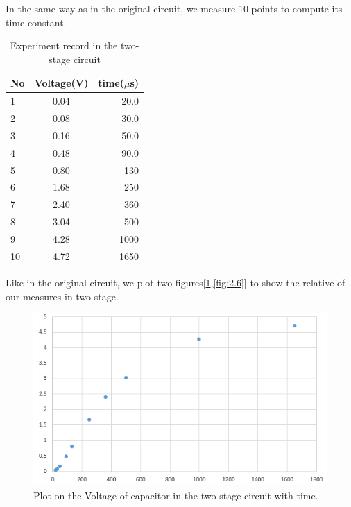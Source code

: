 \phantom{ } In the same way as in the original circuit, we measure 10 points to compute its time constant.
\begin{table}[!htbp]\centering
	\caption{Experiment record in the two-stage circuit}
	\renewcommand\arraystretch{1.5}
	\begin{tabular}{lcr}
		\toprule
		No		&Voltage(V)	&time($\mu$s)	\\
		\midrule
		1		&0.04		&20.0		\\

		2		&0.08		&30.0		\\
		
		3		&0.16		&50.0		\\
		
		4		&0.48		&90.0		\\
		
		5		&0.80		&130		\\
		
		6		&1.68		&250		\\
		
		7		&2.40		&360		\\
		
		8		&3.04		&500		\\
		
		9		&4.28		&1000		\\
		
		10		&4.72		&1650		\\
		\bottomrule
	\end{tabular}
\end{table}
\phantom{ } Like in the original circuit, we plot two figures[\ref{fig:2.5},\ref{fig:2.6}] to show the relative of our measures in two-stage.
\begin{figure}[!htbp]
	\centering %
	\includegraphics[width=\linewidth]{images/2_5.PNG} %
	\caption{Plot on the Voltage of capacitor in the two-stage circuit with time.} %
	\label{fig:2.5} %
\end{figure}
